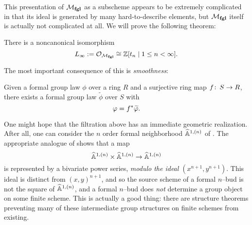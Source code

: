 This presentation of $\mathcal{M}_{\mathbf{fgl}}$ as a subscheme appears to be extremely complicated in that its ideal is generated by many hard-to-describe elements, but $\mathcal{M}_{\mathbf{fgl}}$ itself is actually not complicated at all.  We will prove the following theorem:
\begin{theorem}\label{LazardsTheorem}
There is a noncanonical isomorphism \[L_\infty := \sheaf{O}_{\moduli{fgl}} \cong \Z[t_n \mid 1 \le n < \infty]. \qed\]
\end{theorem}

The most important consequence of this is \emph{smoothness}:
\begin{corollary}\label{MfglIsSmooth}
Given a formal group law $\phi$ over a ring $R$ and a surjective ring map $f\colon\thinspace S \to R$, there exists a formal group law $\widetilde \phi$ over $S$ with \[\phi = f^* \widetilde \phi. \qed\]
\end{corollary}

\begin{remark}
One might hope that the filtration above has an immediate geometric realization.  After all, one can consider the $n${\th} order formal neighborhood $\widehat{\mathbb{A}}^{1, (n)}$ of .  The appropriate analogue of  shows that a map \[\widehat{\mathbb{A}}^{1, (n)} \times \widehat{\mathbb{A}}^{1, (n)} \to \widehat{\mathbb{A}}^{1, (n)}\] is represented by a bivariate power series, \emph{modulo the ideal $(x^{n+1}, y^{n+1})$}.  This ideal is distinct from $(x, y)^{n+1}$, and so the source scheme of a formal $n$--bud is not the square of $\widehat{\mathbb{A}}^{1, (n)}$, and a formal $n$--bud does \emph{not} determine a group object on some finite scheme.  This is actually a good thing: there are structure theorems preventing many of these intermediate group structures on finite schemes from existing.
\end{remark}



